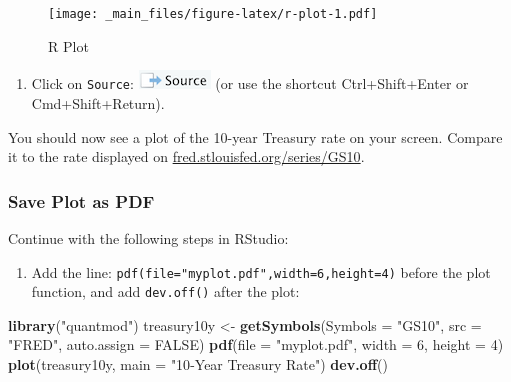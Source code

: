 \documentclass[
]{book}
\newenvironment{Shaded}{\begin{snugshade}}{\end{snugshade}}
\newcommand{\AttributeTok}[1]{\textcolor[rgb]{0.13,0.29,0.53}{#1}}
\newcommand{\ConstantTok}[1]{\textcolor[rgb]{0.56,0.35,0.01}{#1}}
\newcommand{\DecValTok}[1]{\textcolor[rgb]{0.00,0.00,0.81}{#1}}
\newcommand{\FunctionTok}[1]{\textcolor[rgb]{0.13,0.29,0.53}{\textbf{#1}}}
\newcommand{\NormalTok}[1]{#1}
\newcommand{\OtherTok}[1]{\textcolor[rgb]{0.56,0.35,0.01}{#1}}
\newcommand{\StringTok}[1]{\textcolor[rgb]{0.31,0.60,0.02}{#1}}
\providecommand{\tightlist}{%
  \setlength{\itemsep}{0pt}\setlength{\parskip}{0pt}}
\begin{document}
\begin{figure}
\centering
\texttt{[image: \_main\_files/figure-latex/r-plot-1.pdf]}
\caption{\label{fig:r-plot}R Plot}
\end{figure}

\begin{enumerate}
\def\labelenumi{\arabic{enumi}.}
\setcounter{enumi}{4}
\tightlist
\item
  Click on \texttt{Source}: \includegraphics{files/icons-rstudio/source.png} (or use the shortcut Ctrl+Shift+Enter or Cmd+Shift+Return).
\end{enumerate}

You should now see a plot of the 10-year Treasury rate on your screen. Compare it to the rate displayed on \href{https://fred.stlouisfed.org/series/GS10}{fred.stlouisfed.org/series/GS10}.

\hypertarget{save-plot-as-pdf}{%
\subsubsection*{Save Plot as PDF}\label{save-plot-as-pdf}}

Continue with the following steps in RStudio:

\begin{enumerate}
\def\labelenumi{\arabic{enumi}.}
\setcounter{enumi}{5}
\tightlist
\item
  Add the line: \texttt{pdf(file="myplot.pdf",width=6,height=4)} before the plot function, and add \texttt{dev.off()} after the plot:
\end{enumerate}

\begin{Shaded}
\begin{Highlighting}[]
\FunctionTok{library}\NormalTok{(}\StringTok{"quantmod"}\NormalTok{)}
\NormalTok{treasury10y }\OtherTok{\textless{}{-}} \FunctionTok{getSymbols}\NormalTok{(}\AttributeTok{Symbols =} \StringTok{"GS10"}\NormalTok{, }\AttributeTok{src =} \StringTok{"FRED"}\NormalTok{, }\AttributeTok{auto.assign =} \ConstantTok{FALSE}\NormalTok{)}
\FunctionTok{pdf}\NormalTok{(}\AttributeTok{file =} \StringTok{"myplot.pdf"}\NormalTok{, }\AttributeTok{width =} \DecValTok{6}\NormalTok{, }\AttributeTok{height =} \DecValTok{4}\NormalTok{)}
\FunctionTok{plot}\NormalTok{(treasury10y, }\AttributeTok{main =} \StringTok{"10{-}Year Treasury Rate"}\NormalTok{)}
\FunctionTok{dev.off}\NormalTok{()}
\end{Highlighting}
\end{Shaded}
\end{document}
